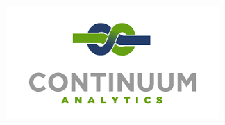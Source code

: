 \documentclass[MASTER.tex]{subfiles}
\begin{document}
\begin{frame}
\begin{figure}
\centering
\includegraphics[width=1.0\linewidth]{continuum}
\end{figure}
	\end{frame}
	
\end{document}
